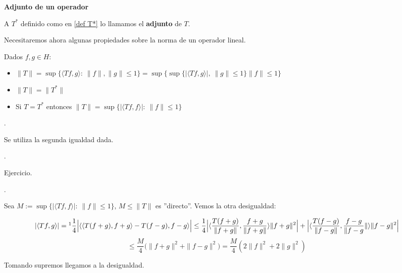 \documentclass[openany]{book}
\begin{document}
\begin{definition}
    \textbf{Adjunto de un operador}

    A $ T^*$ definido como en \eqref{def T*} lo llamamos el \textbf{adjunto} de $ T$.

\end{definition}


Necesitaremos ahora algunas propiedades sobre la norma de un operador lineal.

\begin{lemma} \label{prop norma}
    Dados $ f,g \in H$:
    \begin{itemize}
        \item  $ \|T\| = \sup \{\langle Tf, g \rangle:\ \|f\|,\|g\|\leq 1\} = \sup \{ \sup \{| \langle Tf, g \rangle|,\ \|g\|\leq 1\}\|f\|\leq 1\}$
        \item $ \|T\| = \|T^*\|$
        \item Si $ T = T^*$ entonces $ \|T\| = \sup \{ |\langle Tf, f \rangle|:\ \|f\| \leq  1\}$
    \end{itemize}
\end{lemma}

\begin{demonstration}
    .

    Se utiliza la segunda igualdad dada.

    .

    Ejercicio.

    .

    Sea $ M:=\sup \{ |\langle Tf, f \rangle|:\ \|f\| \leq  1\}$, $ M \leq  \|T\|$ es ''directo''. Vemos la otra desigualdad:

    $$ | \langle Tf, g \rangle| = \footnote{Se utiliza que $ T= T^*$, queda como ejercicio.} \dfrac{1}{4} \Big | \langle \langle T(f+g), f+g \rangle - T(f-g),f-g\rangle \Big | \leq \dfrac{1}{4} \Big | \langle \dfrac{T(f+g)}{\|f+g\|}, \dfrac{f+g}{\|f+g\|} \rangle \|f+g\|^2\Big |  + \Big | \langle \dfrac{T(f-g)}{\|f-g\|}, \dfrac{f-g}{\|f-g}\| \rangle \|f-g\|^2  \Big |$$
    $$ \leq  \dfrac{M}{4} \Big ( \|f+g\|^2+\|f-g\|^2 \Big ) = \dfrac{M}{4} (2 \|f\|^2 + 2\|g\|^2) $$

    Tomando supremos llegamos a la desigualdad.
\end{demonstration}
\end{document}
